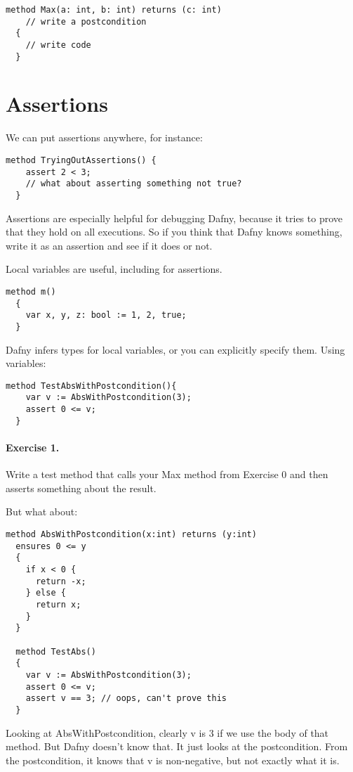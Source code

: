 \documentclass[11pt]{article}
\begin{document}
\begin{lstlisting}[language=dafny]
  method Max(a: int, b: int) returns (c: int)
    // write a postcondition
  {
    // write code
  }
\end{lstlisting}

\section*{Assertions}
We can put assertions anywhere, for instance:
\begin{lstlisting}[language=dafny]
  method TryingOutAssertions() {
    assert 2 < 3;
    // what about asserting something not true?
  }
\end{lstlisting}
Assertions are especially helpful for debugging Dafny, because it tries to prove that they hold
on all executions. So if you think that Dafny knows something, write it as an assertion and see
if it does or not.

Local variables are useful, including for assertions.
\begin{lstlisting}[language=dafny]
  method m()
  {
    var x, y, z: bool := 1, 2, true;
  }
\end{lstlisting}
Dafny infers types for local variables, or you can explicitly specify them. Using variables:
\begin{lstlisting}[language=dafny]
  method TestAbsWithPostcondition(){
    var v := AbsWithPostcondition(3);
    assert 0 <= v;
  }
\end{lstlisting}

\paragraph{Exercise 1.} Write a test method that calls your \textsf{Max} method from Exercise 0
and then asserts something about the result.

But what about:
\begin{lstlisting}[language=dafny]
  method AbsWithPostcondition(x:int) returns (y:int)
  ensures 0 <= y
  {
    if x < 0 {
      return -x;
    } else {
      return x;
    }
  }

  method TestAbs()
  {
    var v := AbsWithPostcondition(3);
    assert 0 <= v;
    assert v == 3; // oops, can't prove this
  }
\end{lstlisting}
Looking at \textsf{AbsWithPostcondition}, clearly \textsf{v} is 3 if we use the body of that method.
But Dafny doesn't know that. It just looks at the postcondition. From the postcondition, it knows
that \textsf{v} is non-negative, but not exactly what it is.
\end{document}
